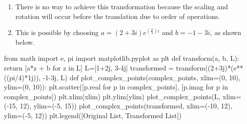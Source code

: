 \documentclass[
  letterpaper,
  DIV=11,
  numbers=noendperiod]{scrartcl}
\newenvironment{Shaded}{\begin{snugshade}}{\end{snugshade}}
\newcommand{\ControlFlowTok}[1]{\textcolor[rgb]{0.00,0.23,0.31}{#1}}
\newcommand{\DecValTok}[1]{\textcolor[rgb]{0.68,0.00,0.00}{#1}}
\newcommand{\ImportTok}[1]{\textcolor[rgb]{0.00,0.46,0.62}{#1}}
\newcommand{\KeywordTok}[1]{\textcolor[rgb]{0.00,0.23,0.31}{#1}}
\newcommand{\NormalTok}[1]{\textcolor[rgb]{0.00,0.23,0.31}{#1}}
\newcommand{\OperatorTok}[1]{\textcolor[rgb]{0.37,0.37,0.37}{#1}}
\newcommand{\OtherTok}[1]{\textcolor[rgb]{0.00,0.23,0.31}{#1}}
\newcommand{\StringTok}[1]{\textcolor[rgb]{0.13,0.47,0.30}{#1}}
\providecommand{\tightlist}{%
  \setlength{\itemsep}{0pt}\setlength{\parskip}{0pt}}\usepackage{longtable,booktabs,array}
\begin{document}
\begin{enumerate}
\def\labelenumi{\alph{enumi}.}
\tightlist
\item
  There is no way to achieve this transformation because the scaling and
  rotation will occur before the translation due to order of operations.
\item
  This is possible by choosing \(a = (2 + 3i)e^{(\frac{\pi}{4})i}\) and
  \(b = -1 - 3i\), as shown below.
\end{enumerate}

\begin{Shaded}
\begin{Highlighting}[numbers=left,,]
\ImportTok{from}\NormalTok{ math }\ImportTok{import}\NormalTok{ e, pi}
\ImportTok{import}\NormalTok{ matplotlib.pyplot }\ImportTok{as}\NormalTok{ plt}
\KeywordTok{def}\NormalTok{ transform(a, b, L): }\ControlFlowTok{return}\NormalTok{ [a}\OperatorTok{*}\NormalTok{z }\OperatorTok{+}\NormalTok{ b }\ControlFlowTok{for}\NormalTok{ z }\KeywordTok{in}\NormalTok{ L]}
\NormalTok{L}\OperatorTok{=}\NormalTok{[}\DecValTok{1}\OperatorTok{+}\OtherTok{2j}\NormalTok{, }\DecValTok{3}\OperatorTok{{-}}\OtherTok{4j}\NormalTok{]}
\NormalTok{transformed }\OperatorTok{=}\NormalTok{ transform((}\DecValTok{2}\OperatorTok{+}\OtherTok{3j}\NormalTok{)}\OperatorTok{*}\NormalTok{(e}\OperatorTok{**}\NormalTok{((pi}\OperatorTok{/}\DecValTok{4}\NormalTok{)}\OperatorTok{*}\OtherTok{1j}\NormalTok{)), }\OperatorTok{{-}}\DecValTok{1}\OperatorTok{{-}}\OtherTok{3j}\NormalTok{, L)}
\KeywordTok{def}\NormalTok{ plot\_complex\_points(complex\_points, xlim}\OperatorTok{=}\NormalTok{(}\DecValTok{0}\NormalTok{, }\DecValTok{10}\NormalTok{), ylim}\OperatorTok{=}\NormalTok{(}\DecValTok{0}\NormalTok{, }\DecValTok{10}\NormalTok{)):}
\NormalTok{    plt.scatter([p.real }\ControlFlowTok{for}\NormalTok{ p }\KeywordTok{in}\NormalTok{ complex\_points], [p.imag }\ControlFlowTok{for}\NormalTok{ p }\KeywordTok{in}\NormalTok{ complex\_points])}
\NormalTok{    plt.xlim(xlim)}
\NormalTok{    plt.ylim(ylim)}
\NormalTok{plot\_complex\_points(L, xlim}\OperatorTok{=}\NormalTok{(}\OperatorTok{{-}}\DecValTok{15}\NormalTok{, }\DecValTok{12}\NormalTok{), ylim}\OperatorTok{=}\NormalTok{(}\OperatorTok{{-}}\DecValTok{5}\NormalTok{, }\DecValTok{15}\NormalTok{))}
\NormalTok{plot\_complex\_points(transformed, xlim}\OperatorTok{=}\NormalTok{(}\OperatorTok{{-}}\DecValTok{10}\NormalTok{, }\DecValTok{12}\NormalTok{), ylim}\OperatorTok{=}\NormalTok{(}\OperatorTok{{-}}\DecValTok{5}\NormalTok{, }\DecValTok{12}\NormalTok{))}
\NormalTok{plt.legend([}\StringTok{\textquotesingle{}Original List\textquotesingle{}}\NormalTok{, }\StringTok{\textquotesingle{}Transformed List\textquotesingle{}}\NormalTok{])}
\end{Highlighting}
\end{Shaded}
\end{document}
